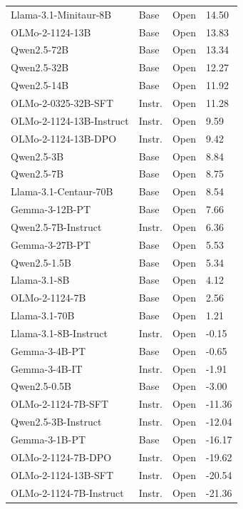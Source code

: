 \documentclass{article} %
\begin{document}
\begin{table}
\begin{tabular}{llll}
        Llama-3.1-Minitaur-8B & Base & Open & 14.50 \\
        \rowcolor[HTML]{EFEFEF}
        OLMo-2-1124-13B & Base & Open & 13.83 \\
        Qwen2.5-72B & Base & Open & 13.34 \\
        \rowcolor[HTML]{EFEFEF}
        Qwen2.5-32B & Base & Open & 12.27 \\
        Qwen2.5-14B & Base & Open & 11.92 \\
        \rowcolor[HTML]{EFEFEF}
        OLMo-2-0325-32B-SFT & Instr. & Open & 11.28 \\
        OLMo-2-1124-13B-Instruct & Instr. & Open & 9.59 \\
        \rowcolor[HTML]{EFEFEF}
        OLMo-2-1124-13B-DPO & Instr. & Open & 9.42 \\
        Qwen2.5-3B & Base & Open & 8.84 \\
        \rowcolor[HTML]{EFEFEF}
        Qwen2.5-7B & Base & Open & 8.75 \\
        Llama-3.1-Centaur-70B & Base & Open & 8.54 \\
        \rowcolor[HTML]{EFEFEF}
        Gemma-3-12B-PT & Base & Open & 7.66 \\
        Qwen2.5-7B-Instruct & Instr. & Open & 6.36 \\
        \rowcolor[HTML]{EFEFEF}
        Gemma-3-27B-PT & Base & Open & 5.53 \\
        Qwen2.5-1.5B & Base & Open & 5.34 \\
        \rowcolor[HTML]{EFEFEF}
        Llama-3.1-8B & Base & Open & 4.12 \\
        OLMo-2-1124-7B & Base & Open & 2.56 \\
        \rowcolor[HTML]{EFEFEF}
        Llama-3.1-70B & Base & Open & 1.21 \\
        \hdashline
        Llama-3.1-8B-Instruct & Instr. & Open & -0.15 \\
        \rowcolor[HTML]{EFEFEF}
        Gemma-3-4B-PT & Base & Open & -0.65 \\
        Gemma-3-4B-IT & Instr. & Open & -1.91 \\
        \rowcolor[HTML]{EFEFEF}
        Qwen2.5-0.5B & Base & Open & -3.00 \\
        OLMo-2-1124-7B-SFT & Instr. & Open & -11.36 \\
        \rowcolor[HTML]{EFEFEF}
        Qwen2.5-3B-Instruct & Instr. & Open & -12.04 \\
        Gemma-3-1B-PT & Base & Open & -16.17 \\
        \rowcolor[HTML]{EFEFEF}
        OLMo-2-1124-7B-DPO & Instr. & Open & -19.62 \\
        OLMo-2-1124-13B-SFT & Instr. & Open & -20.54 \\
        \rowcolor[HTML]{EFEFEF}
        OLMo-2-1124-7B-Instruct & Instr. & Open & -21.36 \\
        \bottomrule
    \end{tabular}
\end{table}
\end{document}
